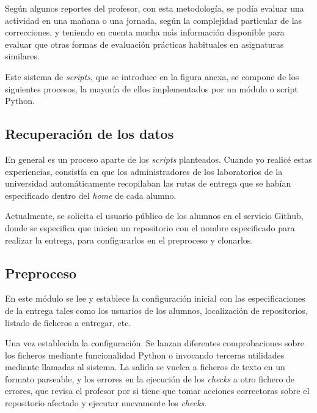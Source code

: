Según algunos reportes del profesor, con esta metodología, se podía evaluar una actividad en una mañana o una jornada, según la complejidad particular de las correcciones, y teniendo en cuenta mucha más información disponible para evaluar que otras formas de evaluación prácticas habituales en asignaturas similares.


Este sistema de \textit{scripts}, que se introduce en la figura anexa, se compone de los siguientes procesos, la mayoría de ellos implementados por un módulo o script Python.


\subsection{Recuperación de los datos}
\label{sec:rec_datos}


En general es un proceso aparte de los \textit{scripts} planteados. Cuando yo realicé estas experiencias, consistía en que los administradores de los laboratorios de la universidad automáticamente recopilaban las rutas de entrega que se habían especificado dentro del \textit{home} de cada alumno.


Actualmente, se solicita el usuario público de los alumnos en el servicio Github, donde se especifica que inicien un repositorio con el nombre especificado para realizar la entrega, para configurarlos en el preproceso y clonarlos.



\subsection{Preproceso}
\label{sec:preproceso}


En este módulo se lee y establece la configuración inicial con las especificaciones de la entrega tales como los usuarios de los alumnos, localización de repositorios, listado de ficheros a entregar, etc.


Una vez establecida la configuración. Se lanzan diferentes comprobaciones sobre los ficheros mediante funcionalidad Python o invocando terceras utilidades mediante llamadas al sistema. La salida se vuelca a ficheros de texto en un formato parseable, y los errores en la ejecución de los \textit{checks} a otro fichero de errores, que revisa el profesor por si tiene que tomar acciones correctoras sobre el repositorio afectado y ejecutar nuevamente los \textit{checks}.


